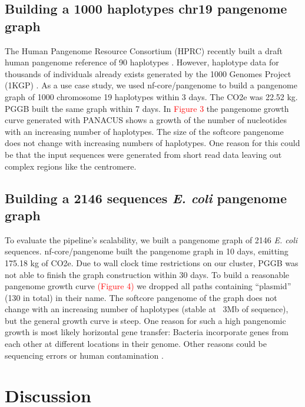 \documentclass{bioinfo}
\theoremstyle{definition}
\newcommand{\red}[1]{{\textcolor{Red}{#1}}}
\begin{document}
	\subsection{Building a 1000 haplotypes chr19 pangenome graph}
	
	The Human Pangenome Resource Consortium (HPRC) recently built a draft human pangenome reference of 90 haplotypes \citep{Liao2023}. 
	However, haplotype data for thousands of individuals already exists generated by the 1000 Genomes Project (1KGP) \citep{Durbin2010}. 
	As a use case study, we used nf-core/pangenome to build a pangenome graph of 1000 chromosome 19 haplotypes \citep{Kuhnle2020} within 3 days. 
	The CO2e was 22.52 kg. PGGB built the same graph within 7 days. 
	In \red{Figure 3} the pangenome growth curve generated with PANACUS \citep{Liao2023} shows a growth of the number of nucleotides with an increasing number of haplotypes.
	The size of the softcore pangenome does not change with increasing numbers of haplotypes.
	One reason for this could be that the input sequences were generated from short read data leaving out complex regions like the centromere.
	
	\subsection{Building a 2146 sequences \textit{E. coli} pangenome graph}
	
	To evaluate the pipeline’s scalability, we built a pangenome graph of 2146 \textit{E. coli} sequences. 
	nf-core/pangenome built the pangenome graph in 10 days, emitting 175.18 kg of CO2e. 
	Due to wall clock time restrictions on our cluster, PGGB was not able to finish the graph construction within 30 days. 
	To build a reasonable pangenome growth curve \red{(Figure 4)} we dropped all paths containing “plasmid” (130 in total) in their name. 
	The softcore pangenome of the graph does not change with an increasing number of haplotypes (stable at ~3Mb of sequence), but the general growth curve is steep. 
	One reason for such a high pangenomic growth is most likely horizontal gene transfer: 
	Bacteria incorporate genes from each other at different locations in their genome. Other reasons could be sequencing errors or human contamination \citep{Breitwieser2019}.
			

	\section{Discussion}
	
\end{document}
